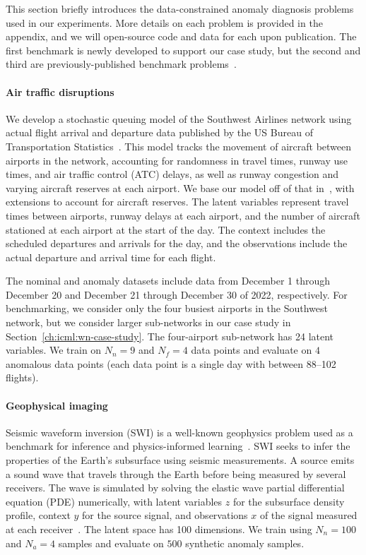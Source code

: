 This section briefly introduces the data-constrained anomaly diagnosis problems used in our experiments. More details on each problem is provided in the appendix, and we will open-source code and data for each upon publication. The first benchmark is newly developed to support our case study, but the second and third are previously-published benchmark problems~\cite{keipourALFADatasetUAV2021,dengOpenFWILargescaleMultistructural2022}.

\paragraph{Air traffic disruptions} We develop a stochastic queuing model of the Southwest Airlines network using actual flight arrival and departure data published by the US Bureau of Transportation Statistics~\cite{bureauoftransportationstatisticsTranStatsDepartmentTransportation}. This model tracks the movement of aircraft between airports in the network, accounting for randomness in travel times, runway use times, and air traffic control (ATC) delays, as well as runway congestion and varying aircraft reserves at each airport. We base our model off of that in~\cite{pyrgiotisModellingDelayPropagation2013}, with extensions to account for aircraft reserves. The latent variables represent travel times between airports, runway delays at each airport, and the number of aircraft stationed at each airport at the start of the day. The context includes the scheduled departures and arrivals for the day, and the observations include the actual departure and arrival time for each flight.

The nominal and anomaly datasets include data from December 1 through December 20 and December 21 through December 30 of 2022, respectively. For benchmarking, we consider only the four busiest airports in the Southwest network, but we consider larger sub-networks in our case study in Section~\ref{ch:icml:wn-case-study}. The four-airport sub-network has 24 latent variables. We train on $N_n = 9$ and $N_f = 4$ data points and evaluate on $4$ anomalous data points (each data point is a single day with between 88--102 flights).

\paragraph{Geophysical imaging} Seismic waveform inversion (SWI) is a well-known geophysics problem used as a benchmark for inference and physics-informed learning~\cite{gouveiaBayesianSeismicWaveform1998,dengOpenFWILargescaleMultistructural2022,zhangBayesianSpatialModelling2016}. SWI seeks to infer the properties of the Earth's subsurface using seismic measurements. A source emits a sound wave that travels through the Earth before being measured by several receivers. The wave is simulated by solving the elastic wave partial differential equation (PDE) numerically, with latent variables $z$ for the subsurface density profile, context $y$ for the source signal, and observations $x$ of the signal measured at each receiver~\cite{richardsonDeepwave2023}. The latent space has 100 dimensions. We train using $N_n = 100$ and $N_a = 4$ samples and evaluate on $500$ synthetic anomaly samples.

